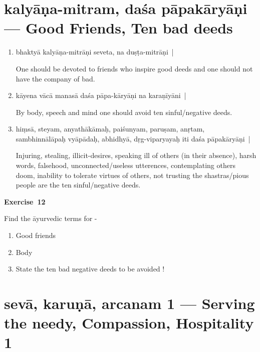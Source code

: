 \chapter{kalyāṇa-mitram, daśa pāpakāryāṇi --- Good Friends, Ten bad deeds}

\begin{enumerate}
\itemsep=0pt
\item {}

bhaktyā kalyāṇa-mitrāṇi seveta, na duṣṭa-mitrāṇi~|

One should be devoted to friends who inspire good deeds and one should not have the company of bad.

\item {}

kāyena vācā manasā daśa pāpa-kāryāṇi na karaṇīyāni~| 

By body, speech and mind one should avoid ten sinful/negative deeds. 

\item {}

hiṃsā, steyam, anyathākāmaḥ, paiśunyam, paruṣam, anṛtam, sambhinnālāpaḥ vyāpādaḥ, abhidhyā, dṛg-viparyayaḥ iti daśa pāpakāryāṇi~|  

Injuring, stealing, illicit-desires, speaking ill of others (in their absence), harsh words, falsehood, unconnected/useless utterences, contemplating others doom, inability to tolerate virtues of others, not trusting the shastras/pious people are the ten  sinful/negative deeds.
\end{enumerate}

\centerline{\textbf{Exercise~12}}

Find the āyurvedic terms for -
\begin{enumerate}
\itemsep=0pt
\renewcommand{\theenumi}{\alph{enumi}}
\renewcommand{\labelenumi}{\theenumi.}
\item Good friends 
\item Body 
\item State the ten bad negative deeds to be avoided !
\end{enumerate}

\chapter{sevā, karuṇā, arcanam  1 --- Serving the needy, Compassion, Hospitality  1}

